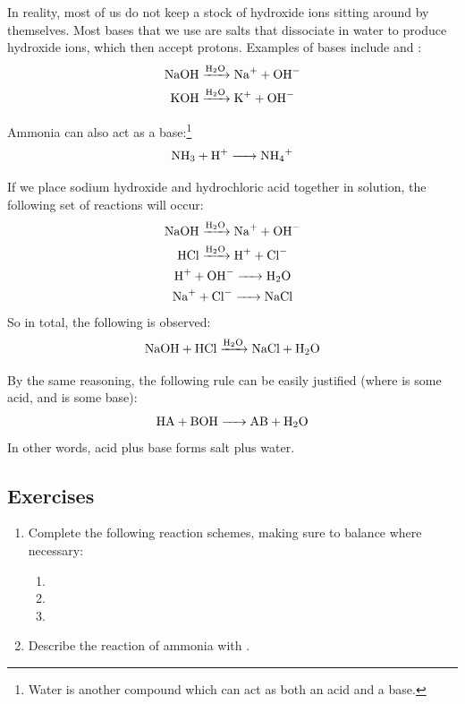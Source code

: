 \documentclass[a4paper]{memoir}
\begin{document}
In reality, most of us do not keep a stock of hydroxide ions sitting around by themselves. Most bases that we use are salts that dissociate in water
to produce hydroxide ions, which then accept protons. Examples of bases include  and :
\begin{gather}
  \ce{NaOH ->[H2O] Na+ + OH-}\\
  \ce{KOH ->[H2O] K+ + OH-}
\end{gather}

Ammonia can also act as a base:\footnote{Water is another compound which can act as both an acid and a base.}
\begin{equation}
  \ce{NH3 + H+ -> NH4+}
\end{equation}

If we place sodium hydroxide and hydrochloric acid together in solution, the following set of reactions will occur:
\begin{gather*}
  \ce{NaOH ->[H2O] Na+ + OH-}\\
  \ce{HCl ->[H2O] H+ + Cl-}\\
  \ce{H+ + OH- -> H2O}\\
  \ce{Na+ + Cl- -> NaCl}
\end{gather*}
So in total, the following is observed:
\begin{equation}
  \ce{NaOH + HCl ->[H2O] NaCl + H2O}
\end{equation}

By the same reasoning, the following rule can be easily justified (where  is some acid, and  is some base):
\begin{equation}
  \ce{HA + BOH -> AB + H2O}
\end{equation}
In other words, acid plus base forms salt plus water.

\subsection*{Exercises}
\begin{enumerate}
  \item Complete the following reaction schemes, making sure to balance where necessary:
    \begin{enumerate}
      \item {}
      \item {}
      \item {}
    \end{enumerate}
  \item Describe the reaction of ammonia with .
\end{enumerate}
\end{document}
